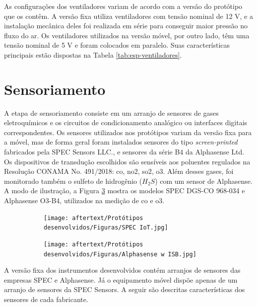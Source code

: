 As configurações dos ventiladores variam de acordo com a versão do protótipo que os contêm. A versão fixa utiliza ventiladores com tensão nominal de 12 V, e a instalação mecânica deles foi realizada em série para conseguir maior pressão no fluxo do ar. Os ventiladores utilizados na versão móvel, por outro lado, têm uma tensão nominal de 5 V e foram colocados em paralelo. Suas características principais estão dispostas na Tabela \ref{tab:esp-ventiladores}.

\section{Sensoriamento}
A etapa de sensoriamento consiste em um arranjo de sensores de gases eletroquímicos e os circuitos de condicionamento analógico ou interfaces digitais correspondentes. Os sensores utilizados nos protótipos variam da versão fixa para a móvel, mas de forma geral foram instalados sensores do tipo \textit{screen-printed} fabricados pela SPEC Sensors LLC., e sensores da série B4 da Alphasense Ltd. Os dispositivos de transdução escolhidos são sensíveis aos poluentes regulados na Resolução CONAMA No. 491/2018: \acrshort{co}, \acrshort{no2}, \acrshort{so2}, \acrshort{o3}. Além desses gases, foi monitorado também o sulfeto de hidrogênio ($H_2S$) com um sensor de Alphasense. A modo de ilustração, a Figura \ref{fig:sensors} mostra os modelos SPEC DGS-CO 968-034 e Alphasense O3-B4, utilizados na medição de \acrshort{co} e \acrshort{o3}.

\begin{figure}[h]
    \centering
    \caption{Sensores dos fabricantes a) SPEC e b) Alphasense}
    \begin{subfigure}{0.495\textwidth}
        \centering
        \texttt{[image: aftertext/Protótipos desenvolvidos/Figuras/SPEC IoT.jpg]}
        \caption{}
        \label{fig:spec-iot}
    \end{subfigure}
    \hfill
    \begin{subfigure}{0.495\textwidth}
        \centering
        \texttt{[image: aftertext/Protótipos desenvolvidos/Figuras/Alphasense w ISB.jpg]}
        \caption{}
        \label{fig:alpha-isb}
    \end{subfigure}
    \label{fig:sensors}
\end{figure}

A versão fixa dos instrumentos desenvolvidos contém arranjos de sensores das empresas SPEC e Alphasense. Já o equipamento móvel dispõe apenas de um arranjo de sensores da SPEC Sensors. A seguir são descritas características dos sensores de cada fabricante.

